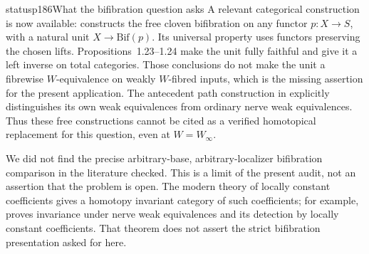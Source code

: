 \begin{dcomment}{status}{p186}{What the bifibration question asks}
A relevant categorical construction is now available: \citet[Theorem~1.17]{ClarkeSchererZeilberger2025} constructs the free cloven bifibration on any functor $p:X\to S$, with a natural unit $X\to\mathrm{Bif}(p)$. Its universal property uses functors preserving the chosen lifts. Propositions~1.23--1.24 make the unit fully faithful and give it a left inverse on total categories. Those conclusions do not make the unit a fibrewise $W$-equivalence on weakly $W$-fibred inputs, which is the missing assertion for the present application. The antecedent path construction in \citet[\S4, pp.~22--23]{Lamarche2013Path} explicitly distinguishes its own weak equivalences from ordinary nerve weak equivalences. Thus these free constructions cannot be cited as a verified homotopical replacement for this question, even at $W=W_\infty$.

We did not find the precise arbitrary-base, arbitrary-localizer bifibration comparison in the literature checked. This is a limit of the present audit, not an assertion that the problem is open. The modern theory of locally constant coefficients gives a homotopy invariant category of such coefficients; for example, \citet[Theorem~1.3 and Corollary~1.28]{Cisinski2009LocallyConstant} proves invariance under nerve weak equivalences and its detection by locally constant coefficients. That theorem does not assert the strict bifibration presentation asked for here.
\end{dcomment}

